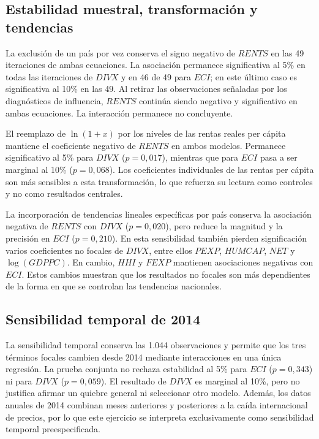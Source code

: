 \documentclass[../../TFM.tex]{subfiles}
\begin{document}
\subsection{Estabilidad muestral, transformación y tendencias}
\label{subsec:resultados-estabilidad-adicional}

La exclusión de un país por vez conserva el signo negativo de $RENTS$ en las 49
iteraciones de ambas ecuaciones. La asociación permanece significativa al 5\%
en todas las iteraciones de $DIVX$ y en 46 de 49 para $ECI$; en este último caso
es significativa al 10\% en las 49. Al retirar las observaciones señaladas por
los diagnósticos de influencia, $RENTS$ continúa siendo negativo y significativo
en ambas ecuaciones. La interacción permanece no concluyente.

El reemplazo de $\ln(1+x)$ por los niveles de las rentas reales per cápita
mantiene el coeficiente negativo de $RENTS$ en ambos modelos. Permanece
significativo al 5\% para $DIVX$ ($p=0,017$), mientras que para $ECI$ pasa a ser
marginal al 10\% ($p=0,068$). Los coeficientes individuales de las rentas per
cápita son más sensibles a esta transformación, lo que refuerza su lectura como
controles y no como resultados centrales.

La incorporación de tendencias lineales específicas por país conserva la
asociación negativa de $RENTS$ con $DIVX$ ($p=0,020$), pero reduce la magnitud y
la precisión en $ECI$ ($p=0,210$). En esta sensibilidad también pierden
significación varios coeficientes no focales de $DIVX$, entre ellos $PEXP$,
$HUMCAP$, $NET$ y $\log(GDPPC)$. En cambio, $HHI$ y $FEXP$ mantienen asociaciones
negativas con $ECI$. Estos cambios muestran que los resultados no focales son
más dependientes de la forma en que se controlan las tendencias nacionales.

\subsection{Sensibilidad temporal de 2014}
\label{subsec:resultados-sensibilidad-2014}

La sensibilidad temporal conserva las 1.044 observaciones y permite que los
tres términos focales cambien desde 2014 mediante interacciones en una única
regresión. La prueba conjunta no rechaza estabilidad al 5\% para $ECI$
($p=0,343$) ni para $DIVX$ ($p=0,059$). El resultado de $DIVX$ es marginal al
10\%, pero no justifica afirmar un quiebre general ni seleccionar otro modelo.
Además, los datos anuales de 2014 combinan meses anteriores y posteriores a la
caída internacional de precios, por lo que este ejercicio se interpreta
exclusivamente como sensibilidad temporal preespecificada.
\end{document}
